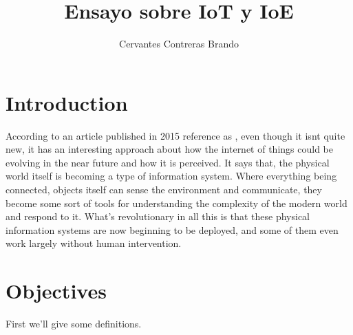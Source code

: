 \documentclass{IEEEtran}
\title{Ensayo sobre IoT y IoE}
\author{Cervantes Contreras Brando}
\begin{document}
\maketitle


\section{Introduction} \label{introduction}
 According to an article published in 2015 reference as \cite{chui2010internet}, even though it isnt quite new, it has an interesting approach
 about how the internet of things could be evolving in the near future and how it is perceived.
 It says that, the physical world itself is becoming a type of information system.
 Where everything being connected, objects itself can sense the environment 
 and communicate, they become some sort of tools for understanding 
 the complexity of the modern world and respond to it.
 What’s revolutionary in all this is that these physical information systems are now beginning to 
 be deployed, and some of them even work largely without human intervention.



\section{Objectives}

First we'll give some definitions.
\end{document}
